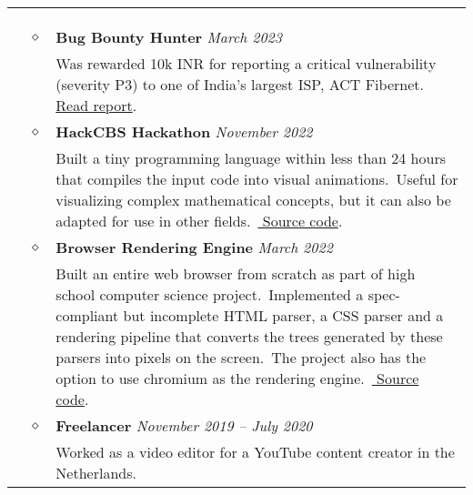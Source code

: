 \documentclass[11pt]{article}
\begin{document}
    \noindent
    \begin{tabularx}{\textwidth}{@{}b{90px} b{9px}@{} X@{}}
        \iftoggle{lines}{\\ \\ \hline \\}{}

        \lettrine[lines=1,loversize=-0.5]{E}XPERIENCE & $\diamond$ &

        \textbf{Bug Bounty Hunter} \hfill \textit{March 2023} \\ & &
        Was rewarded 10k INR for reporting a critical vulnerability (severity P3) to one of India's largest ISP, ACT
        Fibernet.\ \href{https://pdf.sujal.dev/act/report.pdf}{\color{blue} Read report}.\

        \\ & $\diamond$ &

        \textbf{HackCBS Hackathon} \hfill \textit{November 2022} \\ & &
        Built a tiny programming language within less than 24 hours that compiles the input code into visual
        animations.\ Useful for visualizing complex mathematical concepts, but it can also be adapted for use in
        other fields.\ \href{https://github.com/sujaldev/lyn}{\color{blue} Source code}.\

        \\ & $\diamond$ &

        \textbf{Browser Rendering Engine} \hfill \textit{March 2022} \\ & &
        Built an entire web browser from scratch as part of high school computer science project.\ Implemented a
        spec-compliant but incomplete HTML parser, a CSS parser and a rendering pipeline that converts the trees
        generated by these parsers into pixels on the screen.\ The project also has the option to use chromium as the
        rendering engine.\ \href{https://github.com/sujaldev/skylon}{\color{blue} Source code}.\

        \\ & $\diamond$ &

        \textbf{Freelancer} \hfill \textit{November 2019 -- July 2020} \\ & &
        Worked as a video editor for a YouTube content creator in the Netherlands.


\end{tabularx}
\end{document}
